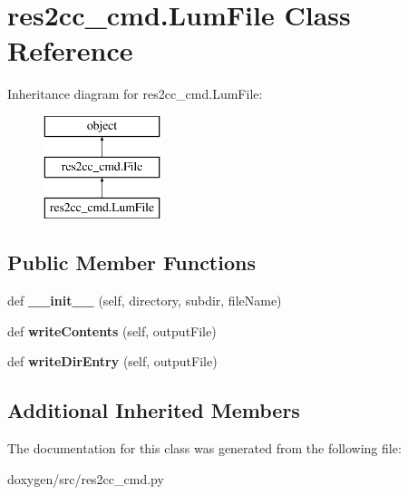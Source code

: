 \hypertarget{classres2cc__cmd_1_1_lum_file}{}\section{res2cc\+\_\+cmd.\+Lum\+File Class Reference}
\label{classres2cc__cmd_1_1_lum_file}
Inheritance diagram for res2cc\+\_\+cmd.\+Lum\+File\+:\begin{figure}[H]
\begin{center}
\leavevmode
\includegraphics[height=3.000000cm]{classres2cc__cmd_1_1_lum_file}
\end{center}
\end{figure}
\subsection*{Public Member Functions}
\begin{DoxyCompactItemize}
\item 
\mbox{\label{classres2cc__cmd_1_1_lum_file_a8714ca37abb677d9c8343592113a6786}} 
def {\bfseries \+\_\+\+\_\+init\+\_\+\+\_\+} (self, directory, subdir, file\+Name)
\item 
\mbox{\label{classres2cc__cmd_1_1_lum_file_aa3c05d203a13c04a5259ca7f3edaa960}} 
def {\bfseries write\+Contents} (self, output\+File)
\item 
\mbox{\label{classres2cc__cmd_1_1_lum_file_af003eaadd7b3b39188752e647856f059}} 
def {\bfseries write\+Dir\+Entry} (self, output\+File)
\end{DoxyCompactItemize}
\subsection*{Additional Inherited Members}


The documentation for this class was generated from the following file\+:\begin{DoxyCompactItemize}
\item 
doxygen/src/res2cc\+\_\+cmd.\+py\end{DoxyCompactItemize}
